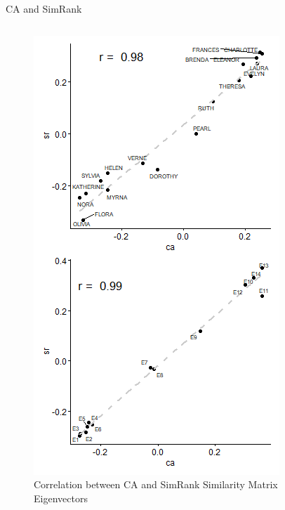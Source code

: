 \documentclass[
  ignorenonframetext,
]{beamer}
\begin{document}
\begin{frame}{CA and SimRank}
\begin{columns}[T]
\begin{column}{0.3\textwidth}
\begin{figure}
{\centering \includegraphics{Plots/sr-corr-scatter.png}

}

\caption{Correlation between CA and SimRank Similarity Matrix
Eigenvectors}

\end{figure}
\end{column}
\end{columns}
\end{frame}
\end{document}
